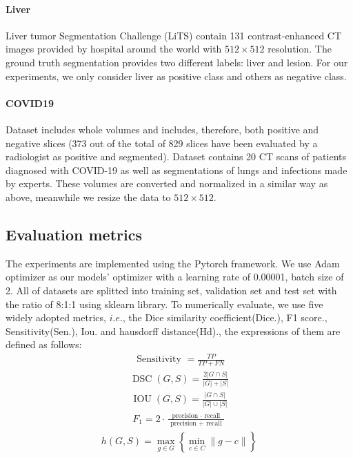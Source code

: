 \documentclass[UTF8]{article} %
\begin{document}
\paragraph{Liver}
Liver tumor Segmentation Challenge (LiTS)\cite{liver} contain 131 contrast-enhanced CT images provided by hospital around the world with \(512 \times 512\) resolution.
The ground truth segmentation provides two different labels: liver and lesion. For our experiments,
we only consider liver as positive class and others as negative class.


\paragraph{COVID19}
Dataset\cite{covid19} includes whole volumes and includes, therefore, both positive and negative slices 
(373 out of the total of 829 slices have been evaluated by a radiologist as positive and segmented). 
Dataset\cite{covid19_2} contains 20 CT scans of patients diagnosed with COVID-19 as well as segmentations of lungs and infections made by experts.
These volumes are converted and normalized in a similar way as above, meanwhile we resize the data to $512\times 512$.

\subsection{Evaluation metrics}
The experiments are implemented using the Pytorch framework. We use Adam optimizer\cite{Adam} as our
models' optimizer with a learning rate of 0.00001, batch size of 2. All of datasets are splitted into training set, validation set and test set with 
the ratio of 8:1:1 using sklearn library. To numerically evaluate, we use five widely adopted metrics, \(i.e.\),
the Dice similarity coefficient(Dice.), F1 score., Sensitivity(Sen.), Iou. and hausdorff distance(Hd)., the expressions of them are defined as follows:
\begin{align}
  \text { Sensitivity }=\frac{T P}{T P+F N}
\end{align}
\begin{align}
  \operatorname{DSC}(G, S)=\frac{2|G \cap S|}{|G|+|S|}
\end{align}
\begin{align}
  \operatorname{IOU}(G, S)=\frac{|G \cap S|}{|G| \cup|S|}
\end{align}
\begin{align}
  F_{1}=2 \cdot \frac{\text { precision } \cdot \text { recall }}{\text { precision }+\text { recall }}
\end{align}
\begin{align}
  h(G, S)=\max _{g \in G}\left\{\min _{c \in C}\|g-c\|\right\}
\end{align}
\end{document}
